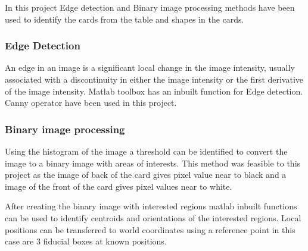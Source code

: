 In this project Edge detection and Binary image processing methods have been used to identify the cards from the table and shapes in the cards.

\subsubsection{Edge Detection}
An edge in an image is a significant local change in the image intensity, usually associated with a discontinuity in either the image intensity or the first derivative of the image intensity\cite{MachineVision}. Matlab toolbox has an inbuilt function for Edge detection. Canny operator\cite{Canny} have been used in this project.

\subsubsection{Binary image processing} Using the histogram of the image a threshold can be identified to convert the image to a binary image with areas of interests. This method was feasible to this project as the image of back of the card gives pixel value near to black and a image of the front of the card gives pixel values near to white. 

After creating the binary image with interested regions matlab inbuilt functions can be used to identify centroids and orientations of the interested regions. Local positions can be transferred to world coordinates using a reference point in this case are 3 fiducial boxes at known positions.
